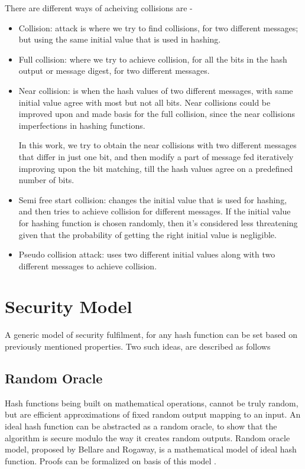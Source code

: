 There are different ways of acheiving collisions are \cite{00045}-
\begin{itemize}
\item Collision: attack is where we try to find collisions, for two different messages; but using the same initial
value that is used in hashing.
\item Full collision: where we try to achieve collision, for all the bits in the hash output or message digest, for
two different messages.
\item Near collision: is when the hash values of two different messages, with same initial value agree with most but
not all bits. Near collisions could be improved upon and made basis for the full collision, since the near collisions
imperfections in hashing functions.

In this work, we try to obtain the near collisions with two different messages that differ in just one bit, and then
modify a part of message fed iteratively improving upon the bit matching, till the hash values agree on a predefined
number of bits.
\item Semi free start collision: changes the initial value that is used for hashing, and then tries to achieve 
collision for different messages. If the initial value for hashing function is chosen randomly, then it's 
considered less threatening given that the probability of getting the right initial value is negligible.
\item Pseudo collision attack: uses two different initial values along with two different messages to achieve 
collision.
\end{itemize}

\section{Security Model}

A generic model of security fulfilment, for any hash function can be set based on previously mentioned
properties. Two such ideas, are described as follows 

  \subsection{ Random Oracle }
  Hash functions being built on mathematical operations, cannot be truly random, but are efficient
  approximations of fixed random output mapping to an input. An ideal hash function can be abstracted 
  as a random oracle, to show that the algorithm is secure modulo the way it creates random outputs. 
  Random oracle model, proposed by Bellare and Rogaway, is a mathematical model of ideal hash function.
  Proofs can be formalized on basis of this model \cite{00018}.
  
